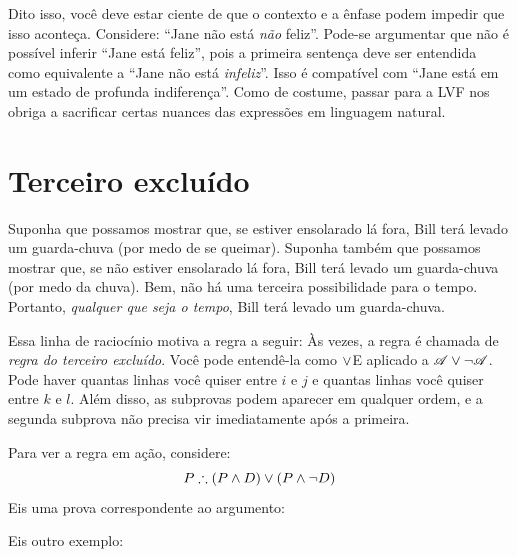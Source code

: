 Dito isso, você deve estar ciente de que o contexto e a ênfase podem impedir que isso aconteça. Considere: \textquotedblleft{}Jane não está \emph{não} feliz\textquotedblright{}. Pode-se argumentar que não é possível inferir \textquotedblleft{}Jane está feliz\textquotedblright{}, pois a primeira sentença deve ser entendida como equivalente a \textquotedblleft{}Jane não está \emph{infeliz}\textquotedblright{}. Isso é compatível com \textquotedblleft{}Jane está em um estado de profunda indiferença\textquotedblright{}. Como de costume, passar para a LVF nos obriga a sacrificar certas nuances das expressões em linguagem natural.

\section{Terceiro excluído}

Suponha que possamos mostrar que, se estiver ensolarado lá fora, Bill terá levado um guarda-chuva (por medo de se queimar). Suponha também que possamos mostrar que, se não estiver ensolarado lá fora, Bill terá levado um guarda-chuva (por medo da chuva). Bem, não há uma terceira possibilidade para o tempo. Portanto, \emph{qualquer que seja o tempo}, Bill terá levado um guarda-chuva.

Essa linha de raciocínio motiva a regra a seguir:
Às vezes, a regra é chamada de \emph{regra do terceiro excluído}. Você
pode entendê-la como $\vee$E aplicado a $\mathscr{A} \vee \neg \mathscr{A}$.
Pode haver quantas linhas você quiser entre $i$ e $j$ e quantas linhas
você quiser entre $k$ e $l$. Além disso, as subprovas podem aparecer em
qualquer ordem, e a segunda subprova não precisa vir imediatamente após a primeira.

Para ver a regra em ação, considere:
	$$P \therefore (P \eand D) \eor (P \eand \enot D)$$
Eis uma prova correspondente ao argumento:
	\begin{fitchproof}
		\PR
		\open
			\AS
		\close
		\open
			\AS
		\close
	\end{fitchproof}
Eis outro exemplo:
\begin{fitchproof}
	\PR
	\open
		\hypo{a}{A}\AS
		\ce{ana, a}
	\close
	\open
		\hypo{na1}{\enot A}\AS
		\by{R}{na1}
	\close
	\tnd{a-na, na1-na2}
\end{fitchproof}


